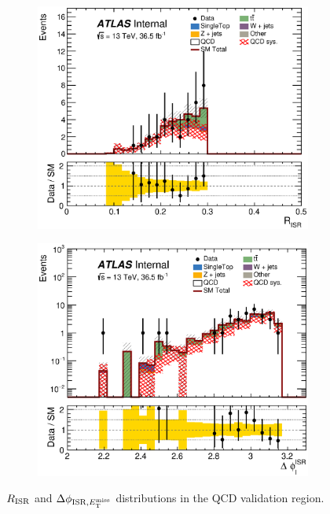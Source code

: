 \begin{figure}[!h]
\begin{center}
    \begin{subfigure}[b]{0.40\textwidth}  
    \includegraphics[width=\textwidth]{figures/QCDJetSmearing/VRqC/RISR_36500} 
                \caption{ }
    \end{subfigure}
    \begin{subfigure}[b]{0.40\textwidth}  
    \includegraphics[width=\textwidth]{figures/QCDJetSmearing/VRqC/dphiISRI_36500.eps}
                \caption{ }
    \end{subfigure}
\caption[~$\RISR$ and $\dphiISRI$ distributions in the QCD validation regions]{$\RISR$ and $\dphiISRI$ distributions in the QCD validation region.}
\label{fig:QCD:VR}
\end{center}
\end{figure}

